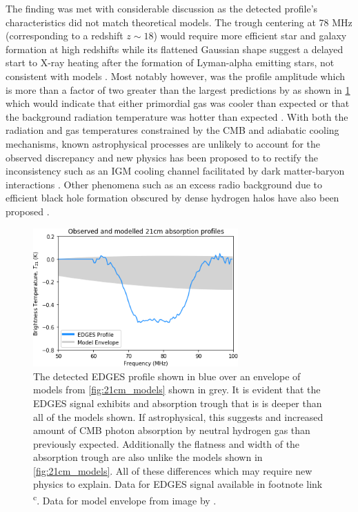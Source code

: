 The finding was met with considerable discussion as the detected profile’s characteristics did not match theoretical models. The trough centering at 78 MHz (corresponding to a redshift $z \sim 18$) would require more efficient star and galaxy formation at high redshifts \citep{edges_star_formation} while its flattened Gaussian shape suggest a delayed start to X-ray heating after the formation of Lyman-alpha emitting stars, not consistent with models \citep{theory_models}. Most notably however, was the profile amplitude which is more than a factor of two greater than the largest predictions by \citet{theory_models} as shown in \cref{fig:edges_signal} which would indicate that either primordial gas was cooler than expected or that the background radiation temperature was hotter than expected \citep{edgesNature}. With both the radiation and gas temperatures constrained by the CMB and adiabatic cooling mechanisms, known astrophysical processes are unlikely to account for the observed discrepancy and new physics has been proposed to to rectify the inconsistency such as an IGM cooling channel facilitated by dark matter-baryon interactions \citep{edgesNature}. Other phenomena such as an excess radio background due to efficient black hole formation obscured by dense hydrogen halos have also been proposed \citep{ew_radio_background}.
\begin{figure}
    \centering
    \includegraphics[width=0.7\textwidth]{edges_signal}
    \caption{The detected EDGES profile shown in blue \citep{edgesNature} over an envelope of models from \cref{fig:21cm_models} shown in grey. It is evident that the EDGES signal exhibits and absorption trough that is is deeper than all of the models shown. If astrophysical, this suggests and increased amount of CMB photon absorption by neutral hydrogen gas than previously expected. Additionally the flatness and width of the absorption trough are also unlike the models shown in \cref{fig:21cm_models}. All of these differences which may require new physics to explain. Data for EDGES signal available in footnote link \textsuperscript{c}. Data for model envelope from image by \citet{theory_models}.}
    \label{fig:edges_signal}
\end{figure}


